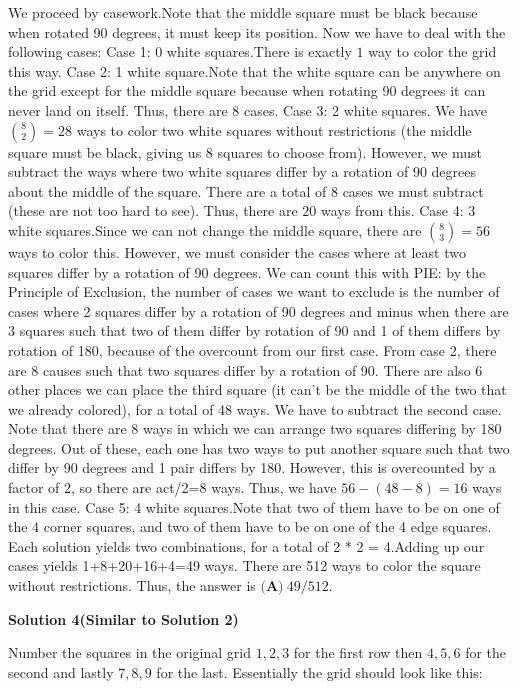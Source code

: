 \begin{enumerate}
We proceed by casework.Note that the middle square must be black because when rotated 90 degrees, it must keep its position. Now we have to deal with the following cases: 
Case 1: 0 white squares.There is exactly $1$ way to color the grid this way. 
Case 2: 1 white square.Note that the white square can be anywhere on the grid except for the middle square because when rotating 90 degrees it can never land on itself. Thus, there are $8$ cases.
Case 3: 2 white squares. We have $\binom{8}{2}=28$ ways to color two white squares without restrictions (the middle square must be black, giving us 8 squares to choose from). However, we must subtract the ways where two white squares differ by a rotation of 90 degrees about the middle of the square. There are a total of 8 cases we must subtract (these are not too hard to see). Thus, there are $20$ ways from this.
Case 4: 3 white squares.Since we can not change the middle square, there are $\binom{8}{3}=56$ ways to color this. However, we must consider the cases where at least two squares differ by a rotation of 90 degrees. We can count this with PIE: by the Principle of Exclusion, the number of cases we want to exclude is the number of cases where 2 squares differ by a rotation of 90 degrees and minus when there are 3 squares such that two of them differ by rotation of 90 and 1 of them differs by rotation of 180, because of the overcount from our first case. From case 2, there are 8 causes such that two squares differ by a rotation of 90. There are also 6 other places we can place the third square (it can't be the middle of the two that we already colored), for a total of 48 ways. We have to subtract the second case. Note that there are 8 ways in which we can arrange two squares differing by 180 degrees. Out of these, each one has two ways to put another square such that two differ by 90 degrees and 1 pair differs by 180. However, this is overcounted by a factor of 2, so there are act/2=8 ways. Thus, we have $56-(48-8)=16$ ways in this case.
Case 5: 4 white squares.Note that two of them have to be on one of the 4 corner squares, and two of them have to be on one of the 4 edge squares. Each solution yields two combinations, for a total of 2 * 2 = 4.Adding up our cases yields 1+8+20+16+4=49 ways. There are 512 ways to color the square without restrictions. Thus, the answer is $\boxed{\textbf{(A)}\ 49/512}$.

 



\textbf{Solution 4(Similar to Solution 2)}

Number the squares in the original grid $1,2,3$ for the first row then $4,5,6$ for the second and lastly $7,8,9$ for the last. Essentially the grid should look like this:


\end{enumerate}
